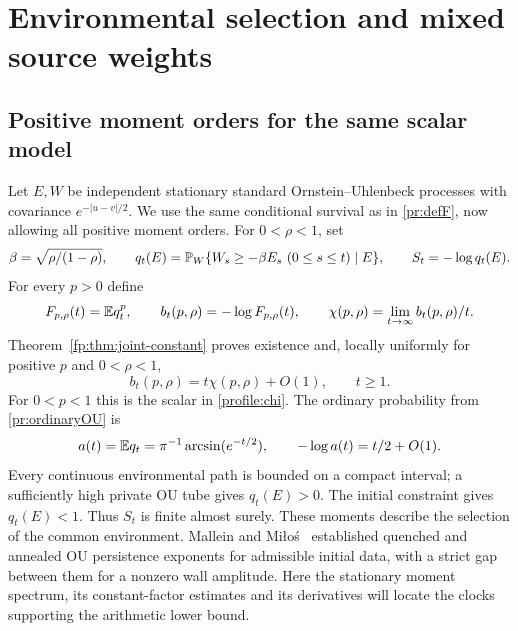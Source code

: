 \section{Environmental selection and mixed source weights}\label{fp:sec:positive}

\subsection{Positive moment orders for the same scalar model}
Let $E,W$ be independent stationary standard Ornstein--Uhlenbeck
processes with covariance $e^{-|u-v|/2}$. We use the same conditional survival as in \eqref{pr:defF}, now allowing all positive moment orders. For $0<\rho<1$, set
\begin{equation}\label{fp:eq:basic}
 \beta=\sqrt{\rho/(1-\rho)},\qquad
 q_t(E)=\mathbb P_W\{W_s\ge-\beta E_s\ (0\le s\le t)\mid E\},
 \qquad S_t=-\log q_t(E).
\end{equation}
For every $p>0$ define
\begin{equation}\label{fp:eq:positive-spectrum}
 F_{p,\rho}(t)=\mathbb E q_t^p,\qquad b_t(p,\rho)=-\log F_{p,\rho}(t),
 \qquad \chi(p,\rho)=\lim_{t\to\infty}b_t(p,\rho)/t.
\end{equation}
Theorem~\ref{fp:thm:joint-constant} proves existence and, locally
uniformly for positive $p$ and $0<\rho<1$,
\begin{equation}\label{fp:eq:constant}
 b_t(p,\rho)=t\chi(p,\rho)+O(1),\qquad t\ge1.
\end{equation}
For $0<p<1$ this is the scalar in \eqref{profile:chi}.
The ordinary probability from \eqref{pr:ordinaryOU} is
\begin{equation}\label{fp:eq:ordinary}
 a(t)=\mathbb E q_t=\pi^{-1}\arcsin(e^{-t/2}),\qquad
 -\log a(t)=t/2+O(1).
\end{equation}
Every continuous environmental path is bounded on a compact interval;
a sufficiently high private OU tube gives $q_t(E)>0$. The initial
constraint gives $q_t(E)<1$. Thus $S_t$ is finite almost surely.
These moments describe the selection of the common environment.
Mallein and Mi\l o\'s~\cite[Theorem~1.6]{MalleinMilos2018} established
quenched and annealed OU persistence exponents for admissible initial
data, with a strict gap between them for a nonzero wall amplitude.
Here the stationary moment spectrum, its constant-factor estimates
and its derivatives will locate the clocks supporting the arithmetic
lower bound.


